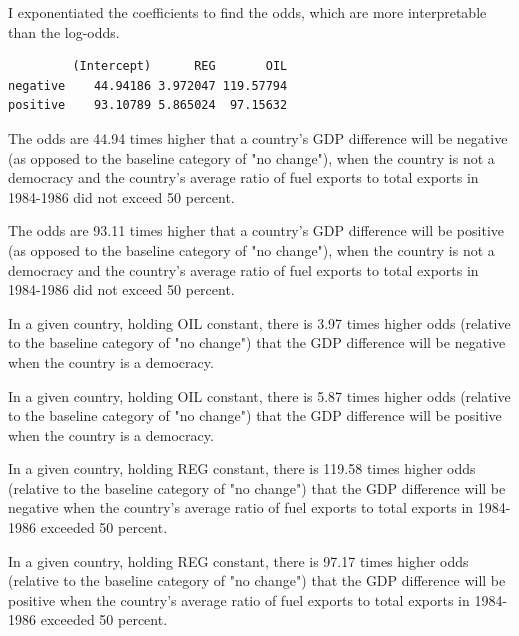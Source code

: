 \documentclass[12pt,letterpaper]{article}
\begin{document}
\vspace{.25cm}

\noindent I exponentiated the coefficients to find the odds, which are more interpretable than the log-odds.


\begin{verbatim}
         (Intercept)      REG       OIL
negative    44.94186 3.972047 119.57794
positive    93.10789 5.865024  97.15632
\end{verbatim}

\noindent The odds are 44.94 times higher that a country's GDP difference will be negative (as opposed to the baseline category of "no change"), when the country is not a democracy and the country's average ratio of fuel exports to total exports in 1984-1986 did not exceed 50 percent.

\vspace{.25cm}

\noindent The odds are 93.11 times higher that a country's GDP difference will be positive (as opposed to the baseline category of "no change"), when the country is not a democracy and the country's average ratio of fuel exports to total exports in 1984-1986 did not exceed 50 percent.


\vspace{.25cm}

\noindent In a given country, holding OIL constant, there is 3.97 times higher odds (relative to the baseline category of "no change") that the GDP difference will be negative when the country is a democracy.

\vspace{.25cm}

\noindent In a given country, holding OIL constant, there is 5.87 times higher odds (relative to the baseline category of "no change") that the GDP difference will be positive when the country is a democracy.

\vspace{.25cm}

\noindent In a given country, holding REG constant, there is 119.58 times higher odds (relative to the baseline category of "no change") that the GDP difference will be negative when the country's average ratio of fuel exports to total exports in 1984-1986 exceeded 50 percent.

\vspace{.25cm}

\noindent In a given country, holding REG constant, there is 97.17 times higher odds (relative to the baseline category of "no change") that the GDP difference will be positive when the country's average ratio of fuel exports to total exports in 1984-1986 exceeded 50 percent.
\end{document}
